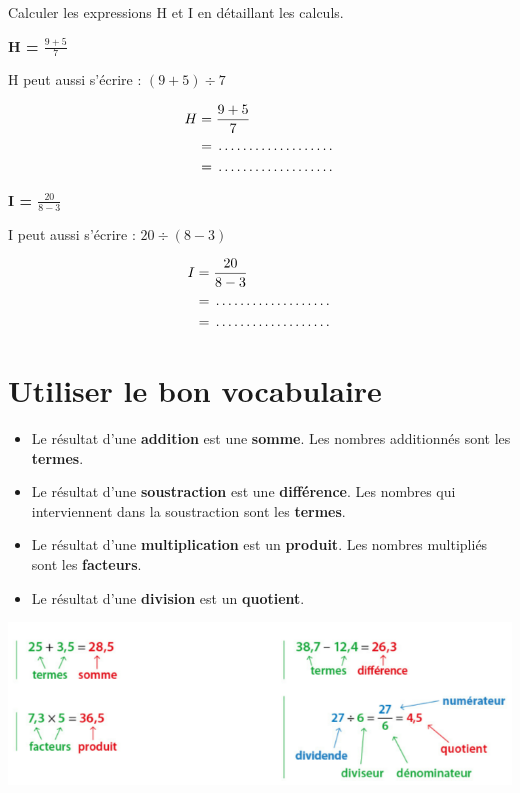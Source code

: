 \begin{examplebox}
Calculer les expressions H et I en détaillant les calculs.

\begin{minipage}{0.48\textwidth}
\textbf{H = $\frac{9 + 5}{7}$}

H peut aussi s'écrire : $(9 + 5) \div 7$

\begin{align*}
H &= \frac{9 + 5}{7} \\
&= \trous{3cm} \\
&= \trous{3cm}
\end{align*}
\end{minipage}
\hfill
\begin{minipage}{0.48\textwidth}
\textbf{I = $\frac{20}{8 - 3}$}

I peut aussi s'écrire : $20 \div (8 - 3)$

\begin{align*}
I &= \frac{20}{8 - 3} \\
&= \trous{3cm} \\
&= \trous{3cm}
\end{align*}
\end{minipage}
\end{examplebox}

\section{Utiliser le bon vocabulaire}
\begin{definitionbox}
\begin{itemize}[label = \textbullet]
\item Le résultat d'une \textbf{addition} est une \textbf{somme}. Les nombres additionnés sont les \textbf{termes}.
\item Le résultat d'une \textbf{soustraction} est une \textbf{différence}. Les nombres qui interviennent dans la soustraction sont les \textbf{termes}.
\item Le résultat d'une \textbf{multiplication} est un \textbf{produit}. Les nombres multipliés sont les \textbf{facteurs}.
\item Le résultat d'une \textbf{division} est un \textbf{quotient}.
\end{itemize}
\end{definitionbox}

\begin{examplebox}
\begin{center}
	\includegraphics[width=1\linewidth]{../../assets/images/6e/seq_01/vocabualire_operations}
\end{center}
\end{examplebox}

